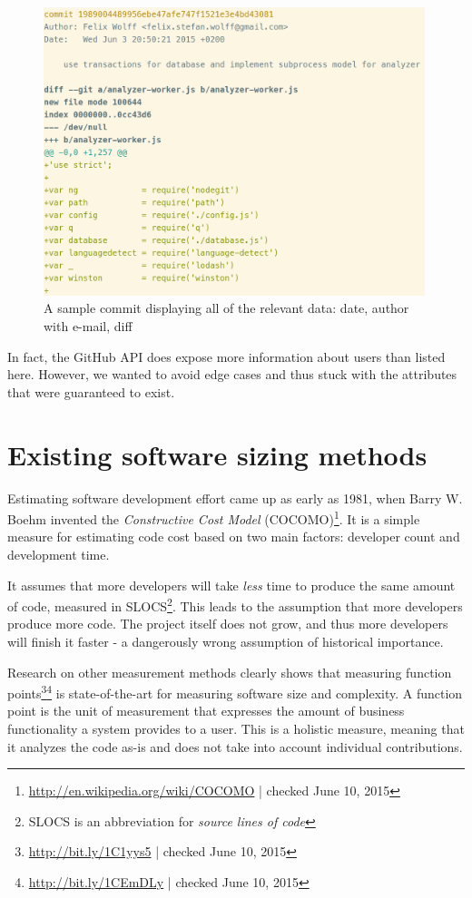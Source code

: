 \begin{figure}
    \includegraphics[width=30em]{gfx/commit.png}
    \caption{A sample commit displaying all of the relevant data: date, author with e-mail, diff}
    \label{fig:commit}
\end{figure}

In fact, the GitHub API does expose more information about users than listed here. However, we wanted
to avoid edge cases and thus stuck with the attributes that were guaranteed to exist.

\section{Existing software sizing methods}
Estimating software development effort came up as early as 1981, when Barry W. Boehm invented the \textit{Constructive Cost Model} (COCOMO)\footnote{\url{http://en.wikipedia.org/wiki/COCOMO} | checked June 10, 2015}.
It is a simple measure for estimating code cost based on two main factors: developer count and development time.
\newline

It assumes that more developers will take \textit{less} time to produce the same amount of code, measured in SLOCS\footnote{SLOCS is an abbreviation for \textit{source lines of code}}. This leads to the assumption that more developers produce more code. The project itself does not grow, and thus more developers will finish it faster - a dangerously wrong assumption of historical importance\cite{fb:1975}.
\newline

Research on other measurement methods clearly shows that measuring function points\footnote{\url{http://bit.ly/1C1yys5} | checked June 10, 2015}\footnote{\url{http://bit.ly/1CEmDLy} | checked June 10, 2015} is state-of-the-art for measuring software size and complexity\cite{linkedin:functionpointstandard}. A function point is the unit of measurement that expresses the amount of business functionality a system provides to a user. This is a holistic measure, meaning that it analyzes the code as-is and does not take into account individual contributions.

